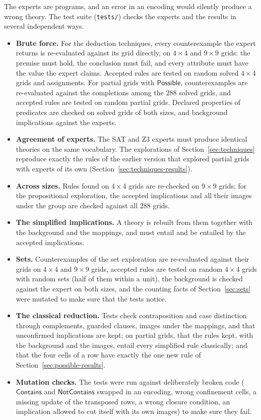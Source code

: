 \documentclass[11pt,a4paper]{article}
\theoremstyle{definition}
\theoremstyle{remark}
\newcommand{\code}[1]{\texttt{#1}}
\newcommand{\pred}[1]{\mathsf{#1}}
\newcommand{\Contains}{\pred{Contains}}
\newcommand{\NotContains}{\pred{NotContains}}
\begin{document}
The experts are programs, and an error in an encoding would silently produce a wrong theory. The test suite (\code{tests/}) checks the experts and the results in several independent ways.
\begin{itemize}
  \item \textbf{Brute force.} For the deduction techniques, every counterexample the expert returns is re-evaluated against its grid directly, on $4 \times 4$ and $9 \times 9$ grids: the premise must hold, the conclusion must fail, and every attribute must have the value the expert claims. Accepted rules are tested on random solved $4 \times 4$ grids and assignments. For partial grids with $\pred{Possible}$, counterexamples are re-evaluated against the completions among the $288$ solved grids, and accepted rules are tested on random partial grids. Declared properties of predicates are checked on solved grids of both sizes, and background implications against the experts.
  \item \textbf{Agreement of experts.} The SAT and Z3 experts must produce identical theories on the same vocabulary. The explorations of Section~\ref{sec:techniques} reproduce exactly the rules of the earlier version that explored partial grids with experts of its own (Section~\ref{sec:techniques-results}).
  \item \textbf{Across sizes.} Rules found on $4 \times 4$ grids are re-checked on $9 \times 9$ grids; for the propositional exploration, the accepted implications and all their images under the group are checked against all $288$ grids.
  \item \textbf{The simplified implications.} A theory is rebuilt from them together with the background and the mappings, and must entail and be entailed by the accepted implications.
  \item \textbf{Sets.} Counterexamples of the set exploration are re-evaluated against their grids on $4 \times 4$ and $9 \times 9$ grids, accepted rules are tested on random $4 \times 4$ grids with random sets (half of them within a unit), the background is checked against the expert on both sizes, and the counting facts of Section~\ref{sec:sets} were mutated to make sure that the tests notice.
  \item \textbf{The classical reduction.} Tests check contraposition and case distinction through complements, guarded clauses, images under the mappings, and that unconfirmed implications are kept; on partial grids, that the rules kept, with the background and the images, entail every simplified rule classically; and that the four cells of a row have exactly the one new rule of Section~\ref{sec:possible-results}.
  \item \textbf{Mutation checks.} The tests were run against deliberately broken code ($\Contains$ and $\NotContains$ swapped in an encoding, wrong confinement cells, a missing update of the transposed rows, a wrong closure condition, an implication allowed to cut itself with its own images) to make sure they fail.
\end{itemize}
\end{document}
